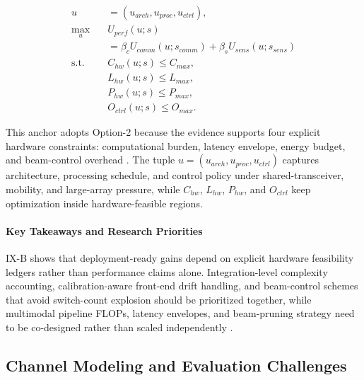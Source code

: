 \documentclass[letterpaper,journal]{IEEEtran}
\begin{document}
\begin{equation}
    \begin{aligned}
        u                 & = (u_{arch},u_{proc},u_{ctrl}),                             \\
        \max_{u} \quad    & U_{perf}(u;s)                                               \\
                          & = \beta_c U_{comm}(u;s_{comm})+\beta_s U_{sens}(u;s_{sens}) \\
        \text{s.t.} \quad & C_{hw}(u;s) \le C_{max},                                    \\
                          & L_{hw}(u;s) \le L_{max},                                    \\
                          & P_{hw}(u;s) \le P_{max},                                    \\
                          & O_{ctrl}(u;s) \le O_{max}.
    \end{aligned}
\end{equation}

This anchor adopts Option-2 because the evidence supports four explicit hardware constraints: computational burden, latency envelope, energy budget, and beam-control overhead \cite{O_ISAC_134, O_ISAC_161, O_ISAC_171}. The tuple $u=(u_{arch},u_{proc},u_{ctrl})$ captures architecture, processing schedule, and control policy under shared-transceiver, mobility, and large-array pressure, while $C_{hw}$, $L_{hw}$, $P_{hw}$, and $O_{ctrl}$ keep optimization inside hardware-feasible regions.

\paragraph{Key Takeaways and Research Priorities}
IX-B shows that deployment-ready gains depend on explicit hardware feasibility ledgers rather than performance claims alone. Integration-level complexity accounting, calibration-aware front-end drift handling, and beam-control schemes that avoid switch-count explosion should be prioritized together, while multimodal pipeline FLOPs, latency envelopes, and beam-pruning strategy need to be co-designed rather than scaled independently \cite{O_ISAC_134, O_ISAC_161, O_ISAC_162, O_ISAC_171}.

\subsection{Channel Modeling and Evaluation Challenges}
\end{document}
